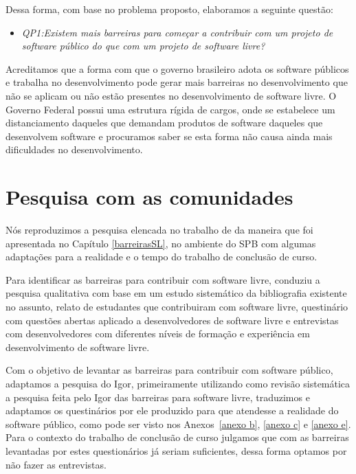 Dessa forma, com base no problema proposto, elaboramos a seguinte questão:

\begin{itemize}
\item \emph{QP1:Existem mais barreiras para começar a contribuir 
com um projeto de software público do que com um projeto de software livre?}

\end{itemize}

Acreditamos que a forma com que o governo brasileiro adota os software públicos
e trabalha no desenvolvimento pode gerar mais barreiras no desenvolvimento que 
não se aplicam ou não estão presentes no desenvolvimento de software livre. O
Governo Federal possui uma estrutura rígida de cargos, onde se estabelece um
distanciamento daqueles que demandam produtos de software daqueles que desenvolvem
software e procuramos saber se esta forma não causa ainda mais dificuldades no 
desenvolvimento.

\section{Pesquisa com as comunidades}

Nós reproduzimos a pesquisa elencada no trabalho de  
da maneira que foi apresentada no Capítulo \ref{barreirasSL}, no ambiente
do SPB com algumas adaptações para a realidade e o tempo do trabalho de conclusão
de curso.

Para identificar as barreiras para contribuir com software livre,  conduziu a 
pesquisa qualitativa com base em um estudo sistemático da bibliografia existente no
assunto, relato de estudantes que contribuiram com software livre, questinário com 
questões abertas aplicado a desenvolvedores de software livre e entrevistas com 
desenvolvedores com diferentes níveis de formação e experiência em desenvolvimento
de software livre.
 
Com o objetivo de levantar as barreiras para contribuir com software público, adaptamos
a pesquisa do Igor, primeiramente utilizando como revisão sistemática a pesquisa feita 
pelo Igor das barreiras para software livre, traduzimos e adaptamos os questinários
por ele produzido para que atendesse a realidade do software público, como pode ser 
visto nos Anexos~\ref{anexo b}, \ref{anexo c} e \ref{anexo e}. Para o contexto do 
trabalho de conclusão de curso julgamos que com as barreiras levantadas por estes 
questionários já seriam suficientes, dessa forma optamos por não fazer as entrevistas.

